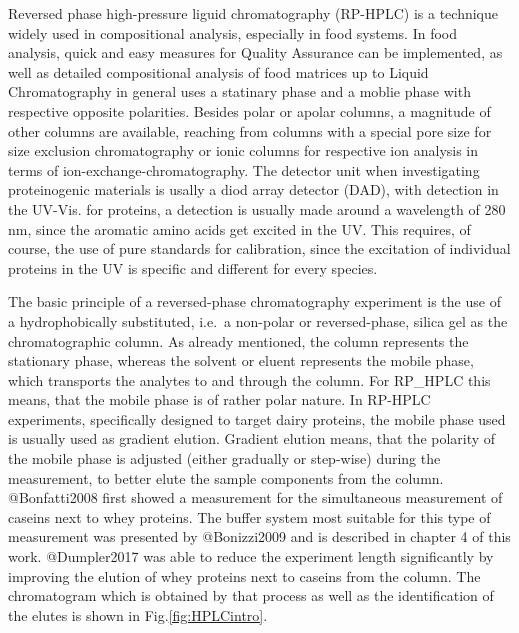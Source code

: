 \documentclass[
]{article}
\begin{document}
Reversed phase high-pressure liguid chromatography (RP-HPLC) is a
technique widely used in compositional analysis, especially in food
systems. In food analysis, quick and easy measures for Quality Assurance
can be implemented, as well as detailed compositional analysis of food
matrices up to Liquid Chromatography in general uses a statinary phase
and a moblie phase with respective opposite polarities. Besides polar or
apolar columns, a magnitude of other columns are available, reaching
from columns with a special pore size for size exclusion chromatography
or ionic columns for respective ion analysis in terms of
ion-exchange-chromatography. The detector unit when investigating
proteinogenic materials is usally a diod array detector (DAD), with
detection in the UV-Vis. for proteins, a detection is usually made
around a wavelength of 280 nm, since the aromatic amino acids get
excited in the UV. This requires, of course, the use of pure standards
for calibration, since the excitation of individual proteins in the UV
is specific and different for every species.

The basic principle of a reversed-phase chromatography experiment is the
use of a hydrophobically substituted, i.e.~a non-polar or
reversed-phase, silica gel as the chromatographic column. As already
mentioned, the column represents the stationary phase, whereas the
solvent or eluent represents the mobile phase, which transports the
analytes to and through the column. For RP\_HPLC this means, that the
mobile phase is of rather polar nature. In RP-HPLC experiments,
specifically designed to target dairy proteins, the mobile phase used is
usually used as gradient elution. Gradient elution means, that the
polarity of the mobile phase is adjusted (either gradually or step-wise)
during the measurement, to better elute the sample components from the
column. @Bonfatti2008 first showed a measurement for the simultaneous
measurement of caseins next to whey proteins. The buffer system most
suitable for this type of measurement was presented by @Bonizzi2009 and
is described in chapter 4 of this work. @Dumpler2017 was able to reduce
the experiment length significantly by improving the elution of whey
proteins next to caseins from the column. The chromatogram which is
obtained by that process as well as the identification of the elutes is
shown in Fig.\ref{fig:HPLCintro}.
\end{document}
